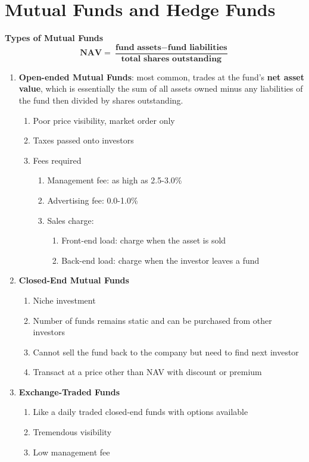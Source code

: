 \documentclass[11pt,fleqn]{book} %
\numberwithin{equation}{section} %
\numberwithin{figure}{section} %
\numberwithin{table}{section} %
\begin{document}
\chapter{Mutual Funds and Hedge Funds}
\begin{definition}\textbf{Types of Mutual Funds}
$$
\textbf{NAV}=\frac{\textbf{fund assets}-\textbf{fund liabilities}}{\textbf{total shares outstanding}}
$$
\begin{enumerate}
    \item \textbf{Open-ended Mutual Funds}: most common, trades at the fund's \textbf{net asset value}, which is essentially the sum of all assets owned minus any liabilities of the fund then divided by shares outstanding.
    \begin{enumerate}
        \item Poor price visibility, market order only
        \item Taxes passed onto investors
        \item Fees required
        \begin{enumerate}
            \item Management fee: as high as 2.5-3.0\%
            \item Advertising fee: 0.0-1.0\%
            \item Sales charge:
            \begin{enumerate}
                \item Front-end load: charge when the asset is sold
                \item Back-end load: charge when the investor leaves a fund
            \end{enumerate}
        \end{enumerate}
    \end{enumerate}
    \item \textbf{Closed-End Mutual Funds}
    \begin{enumerate}
        \item Niche investment
        \item Number of funds remains static and can be purchased from other investors
        \item Cannot sell the fund back to the company but need to find next investor
        \item Transact at a price other than NAV with discount or premium
    \end{enumerate}
    \item \textbf{Exchange-Traded Funds}
    \begin{enumerate}
        \item Like a daily traded closed-end funds with options available
        \item Tremendous visibility
        \item Low management fee
    \end{enumerate}
\end{enumerate}
\end{definition}
\end{document}
